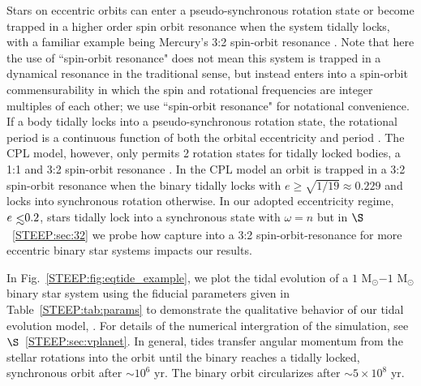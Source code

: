 Stars on eccentric orbits can enter a pseudo-synchronous rotation state or become trapped in a higher order spin orbit resonance when the system tidally locks, with a familiar example being Mercury's 3:2 spin-orbit resonance \citep{GoldreichPeale1966}.  Note that here the use of ``spin-orbit resonance" does not mean this system is trapped in a dynamical resonance in the traditional sense, but instead enters into a spin-orbit commensurability in which the spin and rotational frequencies are integer multiples of each other; we use ``spin-orbit resonance" for notational convenience.  If a body tidally locks into a pseudo-synchronous rotation state, the rotational period is a continuous function of both the orbital eccentricity and period \citep[see][]{Goldreich1966b,Wisdom2008}.  The CPL model, however, only permits 2 rotation states for tidally locked bodies, a 1:1 and 3:2 spin-orbit resonance \citep{Barnes2017}.  In the CPL model an orbit is trapped in a 3:2 spin-orbit resonance when the binary tidally locks with $e \geq \sqrt{1/19} \approx 0.229$ \citep{FerrazMello2008} and locks into synchronous rotation otherwise.  In our adopted eccentricity regime, $e \lsim 0.2$, stars tidally lock into a synchronous state with $\omega = n$ but in $\S$~\ref{STEEP:sec:32} we probe how capture into a 3:2 spin-orbit-resonance for more eccentric binary star systems impacts our results. 

In Fig.~\ref{STEEP:fig:eqtide_example}, we plot the tidal evolution of a $1$ M$_{\odot}$$-1$ M$_{\odot}$ binary star system using the fiducial parameters given in Table~\ref{STEEP:tab:params} to demonstrate the qualitative behavior of our tidal evolution model, \eqtide.  For details of the numerical intergration of the simulation, see $\S$~\ref{STEEP:sec:vplanet}.  In general, tides transfer angular momentum from the stellar rotations into the orbit until the binary reaches a tidally locked, synchronous orbit after ${\sim}10^6$ yr.  The binary orbit circularizes after ${\sim} 5 \times 10^8$ yr.

